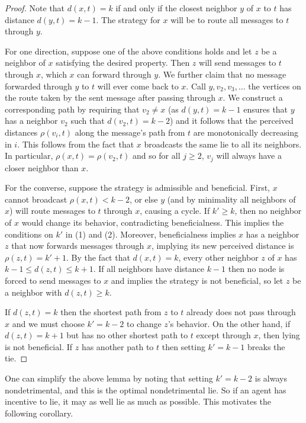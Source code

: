 \documentclass{comnet}
\begin{document}
\begin{proof}

Note that $d(x,t) = k$ if and only if the closest neighbor $y$ of $x$ to $t$
has distance $d(y,t) = k-1$. The strategy for $x$ will be to route all messages
to $t$ through $y$.

For one direction, suppose one of the above conditions holds and let $z$ be a
neighbor of $x$ satisfying the desired property. Then $z$ will send messages to
$t$ through $x$, which $x$ can forward through $y$. We further claim that no
message forwarded through $y$ to $t$ will ever come back to $x$. Call $y, v_2,
v_3, \dots$ the vertices on the route taken by the sent message after passing
through $x$. We construct a corresponding path by requiring that $v_2 \neq x$
(as $d(y,t)=k-1$ ensures that $y$ has a neighbor $v_{2}$ such that
$d(v_{2},t)=k-2$) and it follows that the perceived distances $\rho(v_i, t)$
along the message's path from $t$ are monotonically decreasing in $i$. This
follows from the fact that $x$ broadcasts the same lie to all its neighbors. In
particular, $\rho(x,t) = \rho(v_2, t)$ and so for all $j \geq 2$, $v_j$ will
always have a closer neighbor than $x$.

For the converse, suppose the strategy is admissible and beneficial. First, $x$
cannot broadcast $\rho(x,t) < k-2$, or else $y$ (and by minimality all
neighbors of $x$) will route messages to $t$ through $x$, causing a cycle. If
$k' \geq k$, then no neighbor of $x$ would change its behavior, contradicting
beneficialness. This implies the conditions on $k'$ in (1) and (2). Moreover,
beneficialness implies $x$ has a neighbor $z$ that now forwards messages
through $x$, implying its new perceived distance is $\rho(z,t) = k' + 1$. By
the fact that $d(x,t) = k$, every other neighbor $z$ of $x$ has $k-1 \leq
d(z,t) \leq k+1$. If all neighbors have distance $k-1$ then no node is forced
to send messages to $x$ and implies the strategy is not beneficial, so let $z$
be a neighbor with $d(z,t) \geq k$.

If $d(z,t) = k$ then the shortest path from $z$ to $t$ already does not pass
through $x$ and we must choose $k' = k-2$ to change $z$'s behavior. On the
other hand, if $d(z,t) = k+1$ but has no other shortest path to $t$ except
through $x$, then lying is not beneficial. If $z$ has another
path to $t$ then setting $k' = k-1$ breaks the tie.
\end{proof}

One can simplify the above lemma by noting that setting $k' = k-2$ is always
nondetrimental, and this is the optimal nondetrimental lie. So if an agent has
incentive to lie, it may as well lie as much as possible. This motivates the
following corollary.
\end{document}
